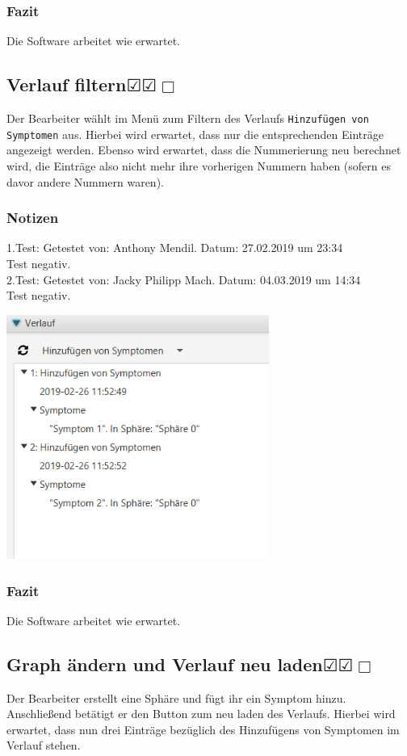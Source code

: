 \documentclass[enabledeprecatedfontcommands]{scrartcl}
\newcommand{\subsectiont}[2]{\subsection[#1]{#1{\normalsize\normalfont #2}}}
\newcommand{\leer}{$\Box$}
\newcommand{\ok}{$\CheckedBox$}
\begin{document}
\subsubsection{Fazit}
Die Software arbeitet wie erwartet.

\subsectiont{Verlauf filtern}{\dotfill\ok\ok\leer}
Der Bearbeiter wählt im Menü zum Filtern des Verlaufs \texttt{Hinzufügen von Symptomen} aus. Hierbei wird erwartet, dass nur die entsprechenden Einträge angezeigt werden. Ebenso wird erwartet, dass die Nummerierung neu berechnet wird, die Einträge also nicht mehr ihre vorherigen Nummern haben (sofern es davor andere Nummern waren). 
\subsubsection{Notizen}
1.Test: Getestet von: Anthony Mendil. Datum: 27.02.2019 um 23:34 \\
Test negativ. \\
2.Test: Getestet von: Jacky Philipp Mach. Datum: 04.03.2019 um 14:34 \\
Test negativ.
\begin{center}
\includegraphics[height=8cm]{verlaufFiltern.PNG}
\end{center}
\subsubsection{Fazit}
Die Software arbeitet wie erwartet.

\subsectiont{Graph ändern und Verlauf neu laden}{\dotfill\ok\ok\leer}
Der Bearbeiter erstellt eine Sphäre und fügt ihr ein Symptom hinzu. Anschließend betätigt er den Button zum neu laden des Verlaufs. Hierbei wird erwartet, dass nun drei Einträge bezüglich des Hinzufügens von Symptomen im Verlauf stehen.
\end{document}
